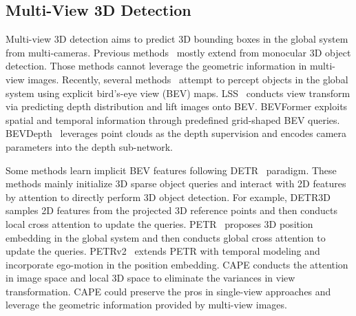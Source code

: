 \documentclass[10pt,twocolumn,letterpaper]{article}
\newcommand{\ourMethod}{CAPE}
\begin{document}
\subsection{Multi-View 3D Detection}
Multi-view 3D detection aims to predict 3D bounding boxes in the global system from multi-cameras. 
Previous methods~\cite{wang2021fcos3d, wang2022probabilistic, epropnp} mostly extend from monocular 3D object detection. 
Those methods cannot leverage the geometric information in multi-view images. 
Recently, several methods~\cite{roddick2018orthographic, roddick2020predicting, philion2020lift, gong2022gitnet, li2022bevformer} attempt to percept objects in the global system using explicit bird's-eye view (BEV) maps. LSS~\cite{philion2020lift} conducts view transform via predicting depth distribution and lift images onto BEV.
BEVFormer\cite{li2022bevformer} exploits  spatial and temporal information through predefined grid-shaped BEV queries. 
BEVDepth~\cite{li2022bevdepth} leverages point clouds as the depth supervision and encodes camera parameters into the depth sub-network.

Some methods learn implicit BEV features following DETR~\cite{carion2020end} paradigm. These methods mainly initialize 3D sparse object queries and interact with 2D features by attention to directly perform 3D object detection. For example, DETR3D~\cite{wang2022detr3d} samples 2D features from the projected 3D reference points and then conducts local cross attention to update the queries. PETR~\cite{liu2022petr} proposes 3D position embedding in the global system and then conducts global cross attention to update the queries. 
PETRv2~\cite{liu2022petrv2} extends PETR with temporal modeling and incorporate ego-motion in the position embedding.
\ourMethod{} conducts the attention in image space and local 3D space to eliminate the variances in view transformation. \ourMethod{} could preserve the pros in single-view approaches and leverage the geometric information provided by multi-view images. 
\end{document}
